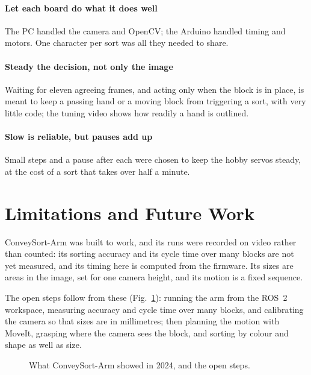 \documentclass[11pt]{article}
\begin{document}
\paragraph{Let each board do what it does well} The PC handled the camera and OpenCV; the Arduino handled timing and motors. One character per sort was all they needed to share.

\paragraph{Steady the decision, not only the image} Waiting for eleven agreeing frames, and acting only when the block is in place, is meant to keep a passing hand or a moving block from triggering a sort, with very little code; the tuning video shows how readily a hand is outlined.

\paragraph{Slow is reliable, but pauses add up} Small steps and a pause after each were chosen to keep the hobby servos steady, at the cost of a sort that takes over half a minute.

\section{Limitations and Future Work}
\label{sec:future}

ConveySort-Arm was built to work, and its runs were recorded on video rather than counted: its sorting accuracy and its cycle time over many blocks are not yet measured, and its timing here is computed from the firmware. Its sizes are areas in the image, set for one camera height, and its motion is a fixed sequence.

The open steps follow from these (Fig.~\ref{fig:roadmap}): running the arm from the ROS~2 workspace, measuring accuracy and cycle time over many blocks, and calibrating the camera so that sizes are in millimetres; then planning the motion with MoveIt, grasping where the camera sees the block, and sorting by colour and shape as well as size.

\begin{figure}[htbp]
  \centering
  \caption{What ConveySort-Arm showed in 2024, and the open steps.}
  \label{fig:roadmap}
\end{figure}
\end{document}
